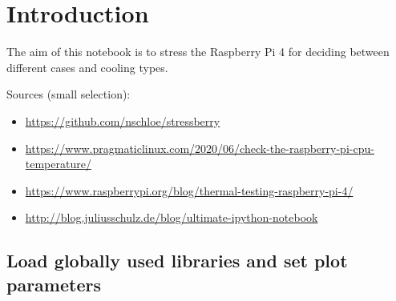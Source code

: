 \documentclass[10pt,parskip=half,
toc=sectionentrywithdots,
bibliography=totocnumbered,
captions=tableheading,numbers=noendperiod]{scrartcl}
\providecommand{\tightlist}{%
  \setlength{\itemsep}{0pt}\setlength{\parskip}{0pt}}
\begin{document}
    \begingroup
    \let\cleardoublepage\relax
    \let\clearpage\relax\tableofcontents\listoffigures{}
    \endgroup

\hypertarget{introduction}{%
\section{Introduction}\label{introduction}}

The aim of this notebook is to stress the Raspberry Pi 4 for deciding
between different cases and cooling types.

Sources (small selection):

\begin{itemize}
\tightlist
\item
  \url{https://github.com/nschloe/stressberry}
\item
  \url{https://www.pragmaticlinux.com/2020/06/check-the-raspberry-pi-cpu-temperature/}
\item
  \url{https://www.raspberrypi.org/blog/thermal-testing-raspberry-pi-4/}
\item
  \url{http://blog.juliusschulz.de/blog/ultimate-ipython-notebook}
\end{itemize}

\hypertarget{load-globally-used-libraries-and-set-plot-parameters}{%
\subsection{Load globally used libraries and set plot
parameters}\label{load-globally-used-libraries-and-set-plot-parameters}}
\end{document}
